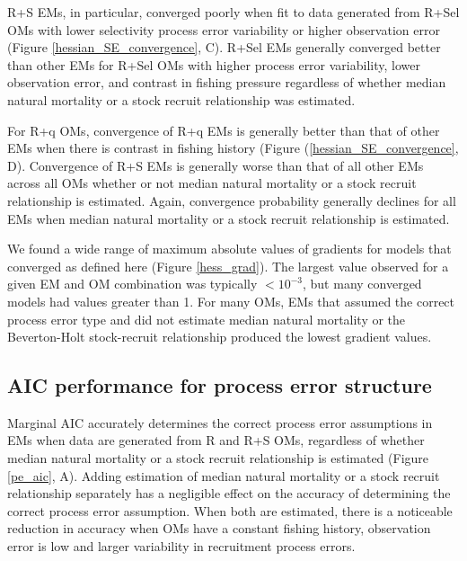 \documentclass[
  12pt,
]{article}
\begin{document}
R+S EMs, in particular, converged poorly when fit to data generated from
R+Sel OMs with lower selectivity process error variability or higher
observation error (Figure \ref{hessian_SE_convergence}, C). R+Sel EMs
generally converged better than other EMs for R+Sel OMs with higher
process error variability, lower observation error, and contrast in
fishing pressure regardless of whether median natural mortality or a
stock recruit relationship was estimated.

For R+q OMs, convergence of R+q EMs is generally better than that of
other EMs when there is contrast in fishing history (Figure
(\ref{hessian_SE_convergence}, D). Convergence of R+S EMs is generally
worse than that of all other EMs across all OMs whether or not median
natural mortality or a stock recruit relationship is estimated. Again,
convergence probability generally declines for all EMs when median
natural mortality or a stock recruit relationship is estimated.

We found a wide range of maximum absolute values of gradients for models
that converged as defined here (Figure \ref{hess_grad}). The largest
value observed for a given EM and OM combination was typically
\(<10^{-3}\), but many converged models had values greater than 1. For
many OMs, EMs that assumed the correct process error type and did not
estimate median natural mortality or the Beverton-Holt stock-recruit
relationship produced the lowest gradient values.

\hypertarget{aic-performance-for-process-error-structure}{%
\subsection*{AIC performance for process error
structure}\label{aic-performance-for-process-error-structure}}

Marginal AIC accurately determines the correct process error assumptions
in EMs when data are generated from R and R+S OMs, regardless of whether
median natural mortality or a stock recruit relationship is estimated
(Figure \ref{pe_aic}, A). Adding estimation of median natural mortality
or a stock recruit relationship separately has a negligible effect on
the accuracy of determining the correct process error assumption. When
both are estimated, there is a noticeable reduction in accuracy when OMs
have a constant fishing history, observation error is low and larger
variability in recruitment process errors.
\end{document}
